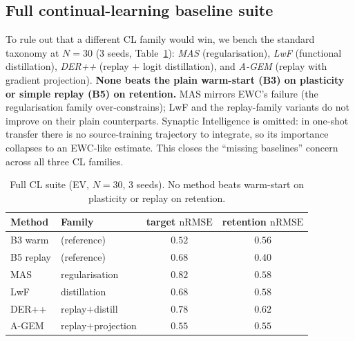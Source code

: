 \documentclass[conference]{IEEEtran}
\newcommand{\nrmse}{\mathrm{nRMSE}}
\begin{document}
\subsection{Full continual-learning baseline suite}
To rule out that a different CL family would win, we bench the standard taxonomy
at $N{=}30$ (3 seeds, Table~\ref{tab:clsuite}): \emph{MAS} (regularisation),
\emph{LwF} (functional distillation), \emph{DER++} (replay $+$ logit
distillation), and \emph{A-GEM} (replay with gradient projection). \textbf{None
beats the plain warm-start (B3) on plasticity or simple replay (B5) on
retention.} MAS mirrors EWC's failure (the regularisation family over-constrains);
LwF and the replay-family variants do not improve on their plain counterparts.
Synaptic Intelligence is omitted: in one-shot transfer there is no source-training
trajectory to integrate, so its importance collapses to an EWC-like estimate. This
closes the ``missing baselines'' concern across all three CL families.

\begin{table}[t]
\centering
\caption{Full CL suite (EV, $N{=}30$, 3 seeds). No method beats warm-start on
plasticity or replay on retention.}
\label{tab:clsuite}
\begin{tabular}{llcc}
\toprule
Method & Family & target $\nrmse$ & retention $\nrmse$\\
\midrule
B3 warm    & (reference)        & $\mathbf{0.52}$ & $0.56$\\
B5 replay  & (reference)        & $0.68$ & $\mathbf{0.40}$\\
MAS        & regularisation     & $0.82$ & $0.58$\\
LwF        & distillation       & $0.68$ & $0.58$\\
DER++      & replay$+$distill   & $0.78$ & $0.62$\\
A-GEM      & replay$+$projection& $0.55$ & $0.55$\\
\bottomrule
\end{tabular}
\end{table}

\end{document}
